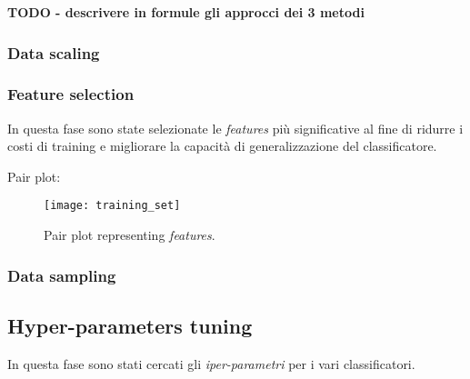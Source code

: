                         \textbf{TODO - descrivere in formule gli approcci dei 3 metodi}
                
                \subsubsection{Data scaling}
                
                \subsubsection{Feature selection}
                
                        In questa fase sono state selezionate le \textit{features} più significative al fine di ridurre i costi di training e migliorare la capacità di generalizzazione del classificatore.
                        
                        Pair plot:
                        \begin{figure}[!h]
                            \centering
                            \texttt{[image: training\_set]}
                            \caption{Pair plot representing \textit{features}.}
                            \label{fig:training_set_pairplot}
                        \end{figure}
                
                \subsubsection{Data sampling}  
                
                

        \subsection{Hyper-parameters tuning}
        
                In questa fase sono stati cercati gli \textit{iper-parametri} per i vari classificatori.
